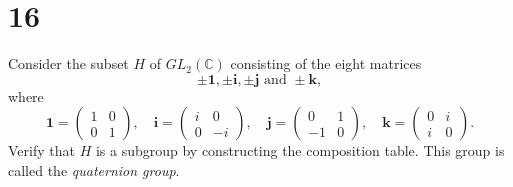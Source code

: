 \documentclass{article}
\begin{document}
\section*{16}
Consider the subset $H$ of $GL_2(\mathbb{C})$ consisting of the eight matrices
\[
\pm\mathbf{1}, \pm\mathbf{i}, \pm\mathbf{j} \text{ and } \pm\mathbf{k},
\]
where 
\[
\mathbf{1} = \begin{pmatrix} 1 & 0 \\ 0 & 1 \end{pmatrix}, \quad
\mathbf{i} = \begin{pmatrix} i & 0 \\ 0 & -i \end{pmatrix}, \quad
\mathbf{j} = \begin{pmatrix} 0 & 1 \\ -1 & 0 \end{pmatrix}, \quad
\mathbf{k} = \begin{pmatrix} 0 & i \\ i & 0 \end{pmatrix}.
\]
Verify that $H$ is a subgroup by constructing the composition table. This group is called the \textit{quaternion group}.
\end{document}
